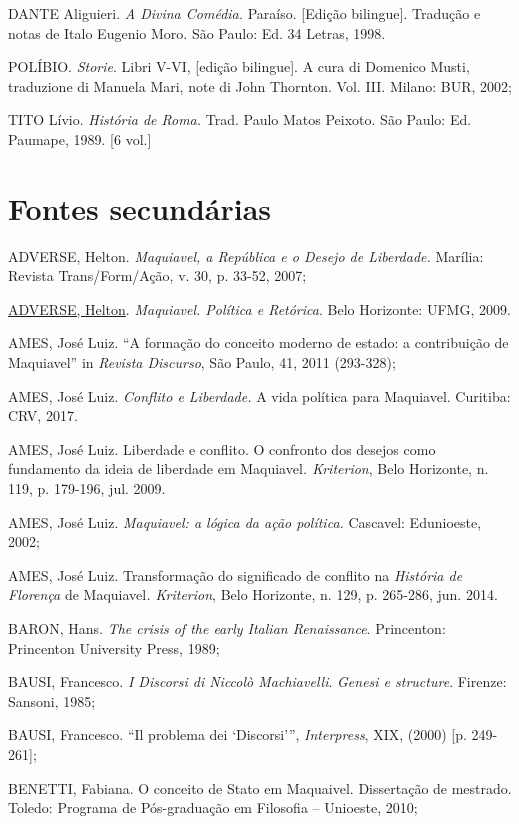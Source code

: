 DANTE Aliguieri. \emph{A Divina Comédia.} Paraíso. {[}Edição
bilingue{]}. Tradução e notas de Italo Eugenio Moro. São Paulo: Ed. 34
Letras, 1998.

POLÍBIO. \emph{Storie}. Libri V-VI, {[}edição bilingue{]}. A cura di
Domenico Musti, traduzione di Manuela Mari, note di John Thornton. Vol.
III. Milano: BUR, 2002;

TITO Lívio. \emph{História de Roma.} Trad. Paulo Matos Peixoto. São
Paulo: Ed. Paumape, 1989. {[}6 vol.{]}

\section{Fontes secundárias}

ADVERSE, Helton. \emph{Maquiavel, a República e o Desejo de Liberdade.}
Marília: Revista Trans/Form/Ação, v. 30, p. 33-52, 2007;

\href{http://lattes.cnpq.br/3325441375860351}{ADVERSE, Helton}.
\emph{Maquiavel. Política e Retórica}. Belo Horizonte: UFMG, 2009.

AMES, José Luiz. ``A formação do conceito moderno de estado: a
contribuição de Maquiavel'' in \emph{Revista Discurso}, São Paulo, 41,
2011 (293-328);

AMES, José Luiz. \emph{Conflito e Liberdade.} A vida política para
Maquiavel. Curitiba: CRV, 2017.

AMES, José Luiz. Liberdade e conflito. O confronto dos desejos como
fundamento da ideia de liberdade em Maquiavel\emph{. Kriterion}, Belo
Horizonte, n. 119, p. 179-196, jul. 2009.

AMES, José Luiz. \emph{Maquiavel: a lógica da ação política.} Cascavel:
Edunioeste, 2002;

AMES, José Luiz. Transformação do significado de conflito na
\emph{História de Florença} de Maquiavel\emph{. Kriterion}, Belo
Horizonte, n. 129, p. 265-286, jun. 2014.

BARON, Hans. \emph{The crisis of the early Italian Renaissance}.
Princenton: Princenton University Press, 1989;

BAUSI, Francesco. \emph{I Discorsi di Niccolò Machiavelli}. \emph{Genesi
e structure}. Firenze: Sansoni, 1985;

BAUSI, Francesco. ``Il problema dei `Discorsi''', \emph{Interpress},
XIX, (2000) {[}p. 249-261{]};

BENETTI, Fabiana. O conceito de Stato em Maquaivel. Dissertação de
mestrado. Toledo: Programa de Pós-graduação em Filosofia -- Unioeste,
2010;

